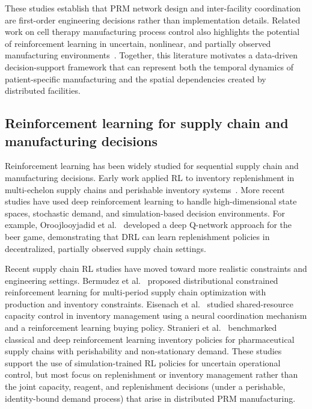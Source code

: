 \documentclass[preprint,review,12pt]{elsarticle}
\begin{document}
These studies establish that PRM network design and inter-facility coordination are first-order engineering decisions rather than implementation details. Related work on cell therapy manufacturing process control also highlights the potential of reinforcement learning in uncertain, nonlinear, and partially observed manufacturing environments~\cite{Zheng2022HybridMBRL}. Together, this literature motivates a data-driven decision-support framework that can represent both the temporal dynamics of patient-specific manufacturing and the spatial dependencies created by distributed facilities.

\subsection{Reinforcement learning for supply chain and manufacturing decisions}
Reinforcement learning has been widely studied for sequential supply chain and manufacturing decisions. Early work applied RL to inventory replenishment in multi-echelon supply chains and perishable inventory systems~\cite{GIANNOCCARO2002153,KARA2018150}. More recent studies have used deep reinforcement learning to handle high-dimensional state spaces, stochastic demand, and simulation-based decision environments. For example, Oroojlooyjadid et al.~\cite{Oroojlooyjadid2022BeerGame} developed a deep Q-network approach for the beer game, demonstrating that DRL can learn replenishment policies in decentralized, partially observed supply chain settings.

Recent supply chain RL studies have moved toward more realistic constraints and engineering settings. Bermudez et al.~\cite{Bermudez2023DCPO} proposed distributional constrained reinforcement learning for multi-period supply chain optimization with production and inventory constraints. Eisenach et al.~\cite{Eisenach2024NeuralCoordination} studied shared-resource capacity control in inventory management using a neural coordination mechanism and a reinforcement learning buying policy. Stranieri et al.~\cite{Stranieri2025PharmaDRL} benchmarked classical and deep reinforcement learning inventory policies for pharmaceutical supply chains with perishability and non-stationary demand. These studies support the use of simulation-trained RL policies for uncertain operational control, but most focus on replenishment or inventory management rather than the joint capacity, reagent, and replenishment decisions (under a perishable, identity-bound demand process) that arise in distributed PRM manufacturing.
\end{document}
